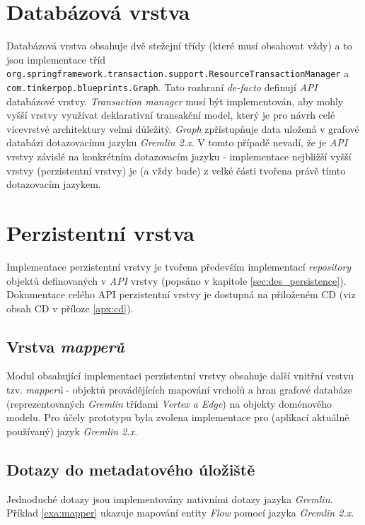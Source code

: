 \section{Databázová vrstva}
Databázová vrstva obsahuje dvě stežejní třídy (které musí obsahovat vždy) a to jsou implementace tříd \texttt{org.springframework.transaction.support.ResourceTransactionManager} a \texttt{com.tinkerpop.blueprints.Graph}. Tato rozhraní \textit{de-facto} definují \textit{API} databázové vrstvy. \textit{Transaction manager} musí být implementován, aby mohly vyšší vrstvy využívat deklarativní transakční model, který je pro návrh celé vícevrstvé architektury velmi důležitý. \textit{Graph} zpřístupňuje data uložená v grafové databázi dotazovacímu jazyku \textit{Gremlin 2.x}. V tomto případě nevadí, že je \textit{API} vrstvy závislé na konkrétním dotazovacím jazyku - implementace nejbližší vyšší vrstvy (perzistentní vrstvy) je (a vždy bude) z velké části tvořena právě tímto dotazovacím jazykem.

\section{Perzistentní vrstva}
Implementace perzistentní vrstvy je tvořena především implementací \textit{repository} objektů definovaných v \textit{API} vrstvy (popsáno v kapitole \ref{sec:des_persistence}). Dokumentace celého API perzistentní vrstvy je dostupná na přiloženém CD (viz obsah CD v příloze \ref{apx:cd}).

\subsection{Vrstva \textit{mapperů}}
Modul obsahující implementaci perzistentní vrstvy obsahuje další vnitřní vrstvu tzv. \textit{mapperů} - objektů provádějících mapování vrcholů a hran grafové databáze (reprezentovaných \textit{Gremlin} třídami \textit{Vertex a Edge}) na objekty doménového modelu.  Pro účely prototypu byla zvolena implementace pro (aplikací aktuálně používaný) jazyk \textit{Gremlin 2.x}.

\subsection{Dotazy do metadatového úložiště}
Jednoduché dotazy jsou implementovány nativními dotazy jazyka \textit{Gremlin}. Příklad \ref{exa:mapper} ukazuje mapování entity \textit{Flow} pomocí jazyka \textit{Gremlin 2.x}.



